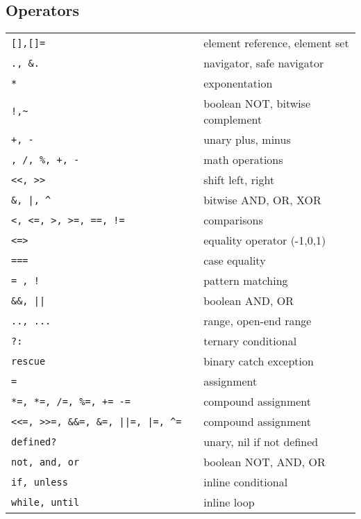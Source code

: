 \documentclass[6pt]{article}
\begin{document}
\begin{multicols}{3}
  \section{Operators}
  \begin{tabular}{L{0.55\linewidth} L{0.45\linewidth}}
    \tt [],[]=                               & element reference, element set  \\
    \tt ., \&.                               & navigator, safe navigator       \\
    \tt **                                   & exponentation                   \\
    \tt !,\~                                 & boolean NOT, bitwise complement \\
    \tt +, -                                 & unary plus, minus               \\
    \tt *, /, \%, +, -                       & math operations                 \\
    \tt <<, >>                               & shift left, right               \\
    \tt \&, |, \^                            & bitwise AND, OR, XOR            \\
    \tt <, <=, >, >=, ==, !=                 & comparisons                     \\
    \tt <=>                                  & equality operator (-1,0,1)      \\
    \tt ===                                  & case equality                   \\
    \tt =~, !~                               & pattern matching                \\
    \tt \&\&, ||                             & boolean AND, OR                 \\
    \tt .., ...                              & range, open-end range           \\
    \tt ?:                                   & ternary conditional             \\
    \tt rescue                               & binary catch exception          \\
    \tt =                                    & assignment                      \\
    \tt **=, *=, /=, \%=, += -=              & compound assignment             \\
    \tt <<=, >>=, \&\&=, \&=, ||=, |=, \^{}= & compound assignment             \\
    \tt defined?                             & unary, nil if not defined       \\
    \tt not, and, or                         & boolean NOT, AND, OR            \\
    \tt if, unless                           & inline conditional              \\
    \tt while, until                         & inline loop                     \\
  \end{tabular}


\end{multicols}
\end{document}
